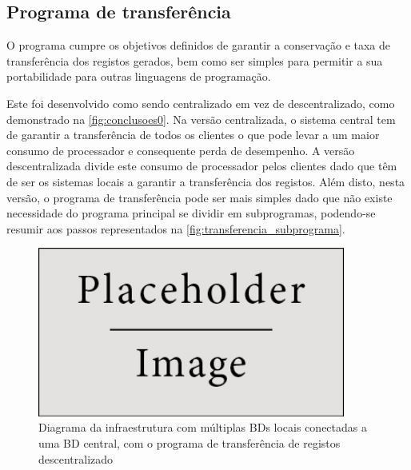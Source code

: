\documentclass[11pt,twoside,a4paper]{report}
\begin{document}
\subsection{Programa de transferência}
O programa cumpre os objetivos definidos de garantir a conservação e taxa de transferência dos registos gerados, bem como ser simples para permitir a sua portabilidade para outras linguagens de programação.\par
Este foi desenvolvido como sendo centralizado em vez de descentralizado, como demonstrado na \autoref{fig:conclusoes0}. 
Na versão centralizada, o sistema central tem de garantir a transferência de todos os clientes o que pode levar a um maior consumo de processador e consequente perda de desempenho. A versão descentralizada divide este consumo de processador pelos clientes dado que têm de ser os sistemas locais a garantir a transferência dos registos. Além disto, nesta versão, o programa de transferência pode ser mais simples dado que não existe necessidade do programa principal se dividir em subprogramas, podendo-se resumir aos passos representados na \autoref{fig:transferencia_subprograma}.
\begin{figure}[H]
	\begin{center}
		\includegraphics[width=0.9\textwidth]{placeholder} %
		\caption{Diagrama da infraestrutura com múltiplas BDs locais conectadas a uma BD central, com o programa de transferência de registos descentralizado}
		\label{fig:conclusoes0}
	\end{center}
\end{figure}
\end{document}
